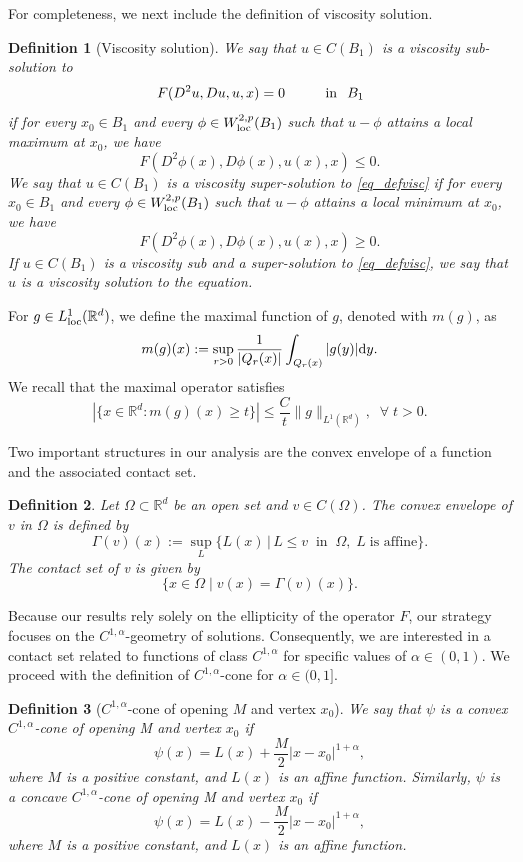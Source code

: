 \documentclass[10pt]{article} %
\newtheorem{Definition}{Definition}
\begin{document}
For completeness, we next include the definition of viscosity solution.

\begin{Definition}[Viscosity solution]\label{def_viscosity}
We say that $u\in C(B_1)$ is a viscosity sub-solution to
\begin{equation}\label{eq_defvisc}
	F(D^2u,Du,u,x) = 0\hspace{.4in}\mbox{in}\hspace{.1in}B_1
\end{equation}
if for every $x_0\in B_1$ and every $\phi\in W^{2,p}_{{\rm loc}}(B_1)$ such that $u-\phi$ attains a local maximum at $x_0$, we have
\[
	F(D^2\phi(x),D\phi(x),u(x),x)\leq 0.
\]
We say that $u\in C(B_1)$ is a viscosity super-solution to \eqref{eq_defvisc} if for every $x_0\in B_1$ and every $\phi\in W^{2,p}_{{\rm loc}}(B_1)$ such that $u-\phi$ attains a local minimum at $x_0$, we have
\[
	F(D^2\phi(x),D\phi(x),u(x),x)\geq 0.
\]
If $u\in C (B_1)$ is a viscosity sub and a super-solution to \eqref{eq_defvisc}, we say that $u$ is a viscosity solution to the equation.
\end{Definition}

For $g\in L^1_{\rm loc}(\mathbb{R}^d)$, we define the maximal function of $g$, denoted with $m(g)$, as
\[
m(g)(x) := \sup_{r>0}\frac{1}{|Q_r(x)|}\int_{Q_r(x)}|g(y)|{\rm d}y.
\]
We recall that the maximal operator satisfies 
\begin{equation}\label{max_op}
|\{x\in\mathbb{R}^d : m(g)(x)\geq t\}| \leq \frac{C}{t}\|g\|_{L^1(\mathbb{R}^d)}, \;\;\forall \;t>0.
\end{equation} 

Two important structures in our analysis are the convex envelope of a function and the associated contact set.
\begin{Definition}
Let $\Omega \subset \mathbb{R}^d$ be an open set and $v \in   C (\Omega)$. The convex envelope of $v$ in $\Omega$ is defined by
\[
\Gamma(v)(x) := \sup_{L}\{L(x)\,|\,L \leq v  \;\;\text{in}\;\;  \Omega, \; L \; \text{is affine}\}.
\]
The contact set of v is given by
\[
\{x \in \Omega\;|\; v(x) = \Gamma(v)(x)\}.
\]
\end{Definition}

Because our results rely solely on the ellipticity of the operator $F$, our strategy focuses on the $C^{1,\alpha}$-geometry of solutions. Consequently, we are interested in a contact set related to functions of class $C^{1,\alpha}$ for specific values of $\alpha\in(0,1)$. We proceed with the definition of $ C ^{1,\alpha}$-cone for $\alpha\in(0,1]$.
\begin{Definition}[$ C ^{1,\alpha}$-cone of opening $M$ and vertex $x_0$]
We say that $\psi$ is a convex $ C ^{1,\alpha}$-cone of opening M and vertex $x_0$ if
\[
	\psi(x) = L(x) + \frac{M}{2}|x - x_0|^{1 + \alpha},
\]
where $M$ is a positive constant, and $L(x)$ is an affine function. Similarly, $\psi$ is a concave  $ C ^{1,\alpha}$-cone of opening M and vertex $x_0$ if
\[
	\psi(x) = L(x) - \frac{M}{2}|x - x_0|^{1 + \alpha},
\]
where $M$ is a positive constant, and $L(x)$ is an affine function.
\end{Definition}
\end{document}
